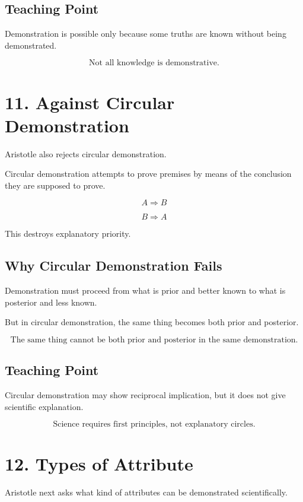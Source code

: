 \documentclass[12pt]{article}
\begin{document}
\subsection*{Teaching Point}

Demonstration is possible only because some truths are known without being
demonstrated.

\[
\boxed{
\text{Not all knowledge is demonstrative.}
}
\]

\section*{11. Against Circular Demonstration}

Aristotle also rejects circular demonstration.

Circular demonstration attempts to prove premises by means of the conclusion
they are supposed to prove.

\[
A \Rightarrow B
\]

\[
B \Rightarrow A
\]

This destroys explanatory priority.

\subsection*{Why Circular Demonstration Fails}

Demonstration must proceed from what is prior and better known to what is
posterior and less known.

But in circular demonstration, the same thing becomes both prior and posterior.

\[
\boxed{
\text{The same thing cannot be both prior and posterior in the same demonstration.}
}
\]

\subsection*{Teaching Point}

Circular demonstration may show reciprocal implication, but it does not give
scientific explanation.

\[
\boxed{
\text{Science requires first principles, not explanatory circles.}
}
\]

\section*{12. Types of Attribute}

Aristotle next asks what kind of attributes can be demonstrated scientifically.
\end{document}
